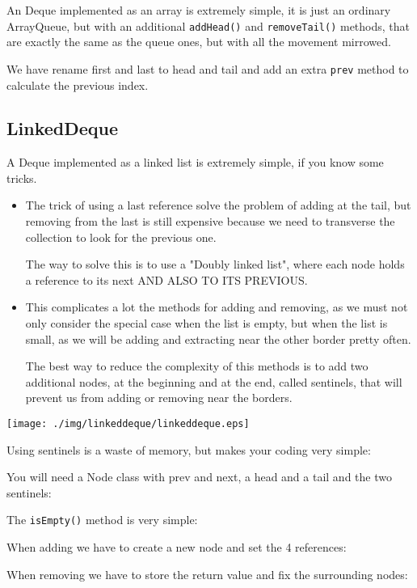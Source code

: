 \documentclass[a4paper, 9pt]{extarticle}
\begin{document}
An Deque implemented as an array is extremely simple, it is just an ordinary
ArrayQueue, but with an additional \verb+addHead()+ and \verb+removeTail()+
methods, that are exactly the same as the queue ones, but with all the
movement mirrowed.

We have rename first and last to head and tail and add an extra \verb+prev+
method to calculate the previous index.






\subsection{LinkedDeque}

A Deque implemented as a linked list is extremely simple, if you know some
tricks.

\begin{itemize}

  \item The trick of using a last reference solve the problem of adding at the
    tail, but removing from the last is still expensive because we need to
    transverse the collection to look for the previous one.

    The way to solve this is to use a "Doubly linked list", where each node
    holds a reference to its next AND ALSO TO ITS PREVIOUS.

  \item This complicates a lot the methods for adding and removing, as we must
    not only consider the special case when the list is empty, but when the
    list is small, as we will be adding and extracting near the other border
    pretty often.

    The best way to reduce the complexity of this methods is to add two
    additional nodes, at the beginning and at the end, called sentinels, that
    will prevent us from adding or removing near the borders.

\end{itemize}

\begin{center}
  \texttt{[image: ./img/linkeddeque/linkeddeque.eps]}
\end{center}

Using sentinels is a waste of memory, but makes your coding very simple:

You will need a Node class with prev and next, a head and a tail and the two
sentinels:


The \verb+isEmpty()+ method is very simple:


When adding we have to create a new node and set the 4 references:


When removing we have to store the return value and fix the surrounding nodes:

\end{document}
